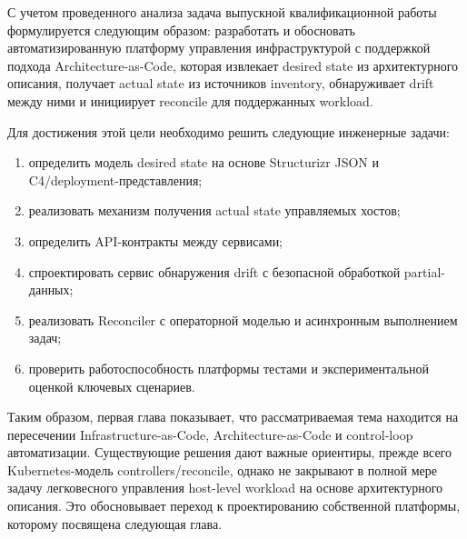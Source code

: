 С учетом проведенного анализа задача выпускной квалификационной работы формулируется следующим образом: разработать и обосновать автоматизированную платформу управления инфраструктурой с поддержкой подхода Architecture-as-Code, которая извлекает desired state из архитектурного описания, получает actual state из источников inventory, обнаруживает drift между ними и инициирует reconcile для поддержанных workload.

Для достижения этой цели необходимо решить следующие инженерные задачи:
\begin{enumerate}
    \item определить модель desired state на основе Structurizr JSON и C4/deployment-представления;
    \item реализовать механизм получения actual state управляемых хостов;
    \item определить API-контракты между сервисами;
    \item спроектировать сервис обнаружения drift с безопасной обработкой partial-данных;
    \item реализовать Reconciler с операторной моделью и асинхронным выполнением задач;
    \item проверить работоспособность платформы тестами и экспериментальной оценкой ключевых сценариев.
\end{enumerate}

Таким образом, первая глава показывает, что рассматриваемая тема находится на пересечении Infrastructure-as-Code, Architecture-as-Code и control-loop автоматизации. Существующие решения дают важные ориентиры, прежде всего Kubernetes-модель controllers/reconcile, однако не закрывают в полной мере задачу легковесного управления host-level workload на основе архитектурного описания. Это обосновывает переход к проектированию собственной платформы, которому посвящена следующая глава.
